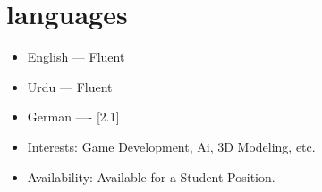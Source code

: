 \documentclass[11pt,a4paper]{article}
\begin{document}
\section*{languages}
\begin{itemize}
\item English --- Fluent
\item Urdu --- Fluent
\item German ---- [2.1]
\end{itemize}

\begin{itemize}
\section*{Addition Information}
\item Interests: Game Development, Ai, 3D Modeling, etc.
\item Availability: Available for a Student Position.
\end{itemize}
\end{document}
